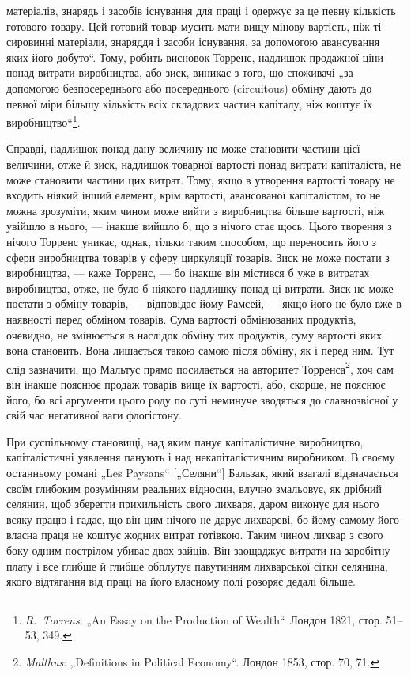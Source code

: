 \parcont{}  %
матеріалів, знарядь і засобів існування для праці і одержує за
це певну кількість готового товару. Цей готовий товар мусить
мати вищу мінову вартість, ніж ті сировинні матеріали, знаряддя
і засоби існування, за допомогою авансування яких його
добуто“. Тому, робить висновок Торренс, надлишок продажної ціни
понад витрати виробництва, або зиск, виникає з того, що споживачі
„за допомогою безпосереднього або посереднього (circuitous)
обміну дають до певної міри більшу кількість всіх складових
частин капіталу, ніж коштує їх виробництво“\footnote{
\emph{R.~Torrens}: „An Essay on the Production of Wealth“. Лондон 1821, стор.
51--53, 349.
}.

Справді, надлишок понад дану величину не може становити
частини цієї величини, отже й зиск, надлишок товарної вартості
понад витрати капіталіста, не може становити частини цих витрат.
Тому, якщо в утворення вартості товару не входить
ніякий інший елемент, крім вартості, авансованої капіталістом,
то не можна зрозуміти, яким чином може вийти з виробництва
більше вартості, ніж увійшло в нього, — інакше вийшло б, що
з нічого стає щось. Цього творення з нічого Торренс уникає,
однак, тільки таким способом, що переносить його з сфери виробництва
товарів у сферу циркуляції товарів. Зиск не може постати
з виробництва, — каже Торренс, — бо інакше він містився б уже
в витратах виробництва, отже, не було б ніякого надлишку понад
ці витрати. Зиск не може постати з обміну товарів, — відповідає
йому Рамсей, — якщо його не було вже в наявності перед обміном
товарів. Сума вартості обмінюваних продуктів, очевидно,
не змінюється в наслідок обміну тих продуктів, суму вартості
яких вона становить. Вона лишається такою самою після обміну,
як і перед ним. Тут слід зазначити, що Мальтус прямо посилається
на авторитет Торренса\footnote{
\emph{Malthus}: „Definitions in Political Economy“. Лондон 1853, стор. 70, 71.
}, хоч сам він інакше пояснює
продаж товарів вище їх вартості, або, скорше, не пояснює його,
бо всі аргументи цього роду по суті неминуче зводяться до
славнозвісної у свій час негативної ваги флогістону.

При суспільному становищі, над яким панує капіталістичне виробництво,
капіталістичні уявлення панують і над некапіталістичним
виробником. В своєму останньому романі „Les Paysans“
[„Селяни“] Бальзак, який взагалі відзначається своїм глибоким
розумінням реальних відносин, влучно змальовує, як дрібний
селянин, щоб зберегти прихильність свого лихваря, даром виконує
для нього всяку працю і гадає, що він цим нічого не
дарує лихвареві, бо йому самому його власна праця не коштує
жодних витрат готівкою. Таким чином лихвар з свого боку
одним пострілом убиває двох зайців. Він заощаджує витрати
на заробітну плату і все глибше й глибше обплутує павутинням
лихварської сітки селянина, якого відтягання від праці на його
власному полі розоряє дедалі більше.
